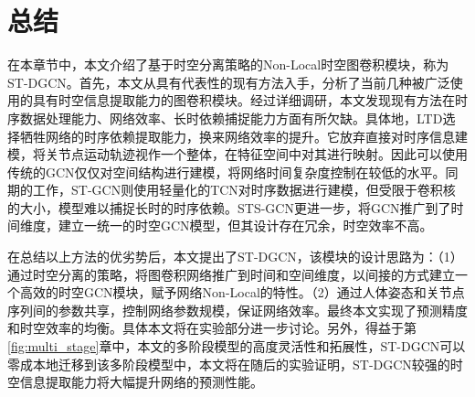 \section{总结}
在本章节中，本文介绍了基于时空分离策略的Non-Local时空图卷积模块，称为ST-DGCN。首先，本文从具有代表性的现有方法入手，分析了当前几种被广泛使用的具有时空信息提取能力的图卷积模块。经过详细调研，本文发现现有方法在时序数据处理能力、网络效率、长时依赖捕捉能力方面有所欠缺。具体地，LTD\parencite{mao2019learning}选择牺牲网络的时序依赖提取能力，换来网络效率的提升。它放弃直接对时序信息建模，将关节点运动轨迹视作一个整体，在特征空间中对其进行映射。因此可以使用传统的GCN仅仅对空间结构进行建模，将网络时间复杂度控制在较低的水平。同期的工作，ST-GCN\parencite{yan2018spatial}则使用轻量化的TCN对时序数据进行建模，但受限于卷积核的大小，模型难以捕捉长时的时序依赖。STS-GCN更进一步，将GCN推广到了时间维度，建立一统一的时空GCN模型，但其设计存在冗余，时空效率不高。

在总结以上方法的优劣势后，本文提出了ST-DGCN，该模块的设计思路为：（1）通过时空分离的策略，将图卷积网络推广到时间和空间维度，以间接的方式建立一个高效的时空GCN模块，赋予网络Non-Local的特性。（2）通过人体姿态和关节点序列间的参数共享，控制网络参数规模，保证网络效率。最终本文实现了预测精度和时空效率的均衡。具体本文将在实验部分进一步讨论。另外，得益于第\ref{fig:multi_stage}章中，本文的多阶段模型的高度灵活性和拓展性，ST-DGCN可以零成本地迁移到该多阶段模型中，本文将在随后的实验证明，ST-DGCN较强的时空信息提取能力将大幅提升网络的预测性能。